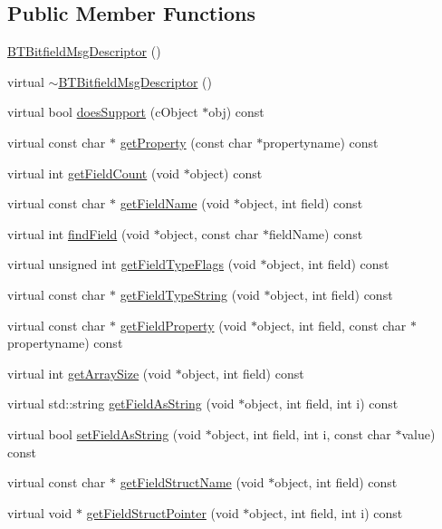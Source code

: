 \subsection*{Public Member Functions}
\begin{DoxyCompactItemize}
\item 
\hyperlink{classBTBitfieldMsgDescriptor_ad4051badc3177f22c72bfd32065872f3}{B\+T\+Bitfield\+Msg\+Descriptor} ()
\item 
virtual \hyperlink{classBTBitfieldMsgDescriptor_acf7e4166af1697dd00657f7980d71756}{$\sim$\+B\+T\+Bitfield\+Msg\+Descriptor} ()
\item 
virtual bool \hyperlink{classBTBitfieldMsgDescriptor_a8435f3275120e0e76f31a21061b6f4d8}{does\+Support} (c\+Object $\ast$obj) const 
\item 
virtual const char $\ast$ \hyperlink{classBTBitfieldMsgDescriptor_a5b215b7ab75a11e0fb21f517b14937ad}{get\+Property} (const char $\ast$propertyname) const 
\item 
virtual int \hyperlink{classBTBitfieldMsgDescriptor_a60200f125a6d0704b580b25b0e21e2f8}{get\+Field\+Count} (void $\ast$object) const 
\item 
virtual const char $\ast$ \hyperlink{classBTBitfieldMsgDescriptor_a780143d4b4bcc4b5132a02d83fb77207}{get\+Field\+Name} (void $\ast$object, int field) const 
\item 
virtual int \hyperlink{classBTBitfieldMsgDescriptor_a3299272ebd49d6e2a8bedbf033111c53}{find\+Field} (void $\ast$object, const char $\ast$field\+Name) const 
\item 
virtual unsigned int \hyperlink{classBTBitfieldMsgDescriptor_a27e94d0cf2686869684b47a718da76c7}{get\+Field\+Type\+Flags} (void $\ast$object, int field) const 
\item 
virtual const char $\ast$ \hyperlink{classBTBitfieldMsgDescriptor_a5868329af54dad534959851554201185}{get\+Field\+Type\+String} (void $\ast$object, int field) const 
\item 
virtual const char $\ast$ \hyperlink{classBTBitfieldMsgDescriptor_a4dc4158c7651028bd995cce6cf5bfe23}{get\+Field\+Property} (void $\ast$object, int field, const char $\ast$propertyname) const 
\item 
virtual int \hyperlink{classBTBitfieldMsgDescriptor_aa0599043f7af977294a91d14c1807d29}{get\+Array\+Size} (void $\ast$object, int field) const 
\item 
virtual std\+::string \hyperlink{classBTBitfieldMsgDescriptor_ad9261d5de7428a2d5122259aa6519782}{get\+Field\+As\+String} (void $\ast$object, int field, int i) const 
\item 
virtual bool \hyperlink{classBTBitfieldMsgDescriptor_a2c1652639718a4560adecc32f3b09277}{set\+Field\+As\+String} (void $\ast$object, int field, int i, const char $\ast$value) const 
\item 
virtual const char $\ast$ \hyperlink{classBTBitfieldMsgDescriptor_a51eaf55f2275d9a291d9f04a0782d566}{get\+Field\+Struct\+Name} (void $\ast$object, int field) const 
\item 
virtual void $\ast$ \hyperlink{classBTBitfieldMsgDescriptor_a3da00a312ac2c38159ff9a11d82abb15}{get\+Field\+Struct\+Pointer} (void $\ast$object, int field, int i) const 
\end{DoxyCompactItemize}


